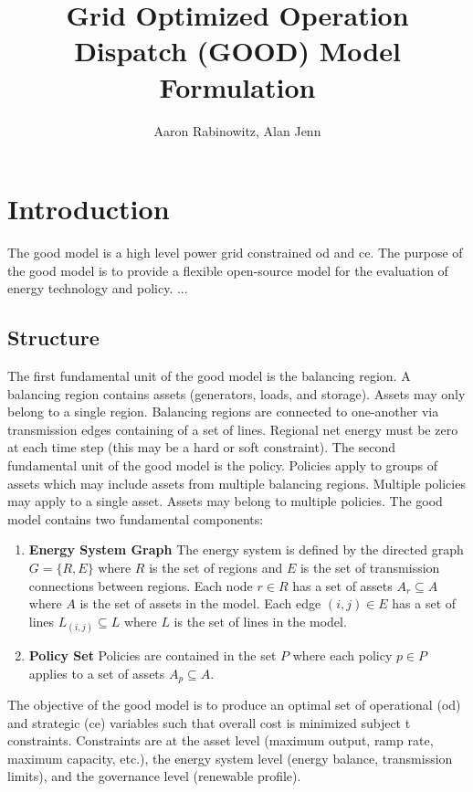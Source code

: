 \documentclass[12pt]{article}
\title{Grid Optimized Operation Dispatch (GOOD) Model Formulation}
\author{Aaron Rabinowitz, Alan Jenn}
\date{}
\begin{document}
\maketitle

\section{Introduction}

The \gls{good} model is a high level power grid constrained \gls{od} and \gls{ce}. The purpose of the \gls{good} model is to provide a flexible open-source model for the evaluation of energy technology and policy. ...

\subsection{Structure}

The first fundamental unit of the \gls{good} model is the balancing region. A balancing region contains assets (generators, loads, and storage). Assets may only belong to a single region. Balancing regions are connected to one-another via transmission edges containing of a set of lines. Regional net energy must be zero at each time step (this may be a hard or soft constraint). The second fundamental unit of the \gls{good} model is the policy. Policies apply to groups of assets which may include assets from multiple balancing regions. Multiple policies may apply to a single asset. Assets may belong to multiple policies. The \gls{good} model contains two fundamental components:

\begin{enumerate}
	\item \textbf{Energy System Graph} The energy system is defined by the directed graph $G = \{R, E\}$ where $R$ is the set of regions and $E$ is the set of transmission connections between regions. Each node $r \in R$ has a set of assets $A_r \subseteq A$ where $A$ is the set of assets in the model. Each edge $(i, j) \in E$ has a set of lines $L_{(i, j)} \subseteq L$ where $L$ is the set of lines in the model.
	\item \textbf{Policy Set} Policies are contained in the set $P$ where each policy $p \in P$ applies to a set of assets $A_p \subseteq A$.
\end{enumerate}

The objective of the \gls{good} model is to produce an optimal set of operational (\gls{od}) and strategic (\gls{ce}) variables such that overall cost is minimized subject t constraints. Constraints are at the asset level (maximum output, ramp rate, maximum capacity, etc.), the energy system level (energy balance, transmission limits), and the governance level (renewable profile).
\end{document}
